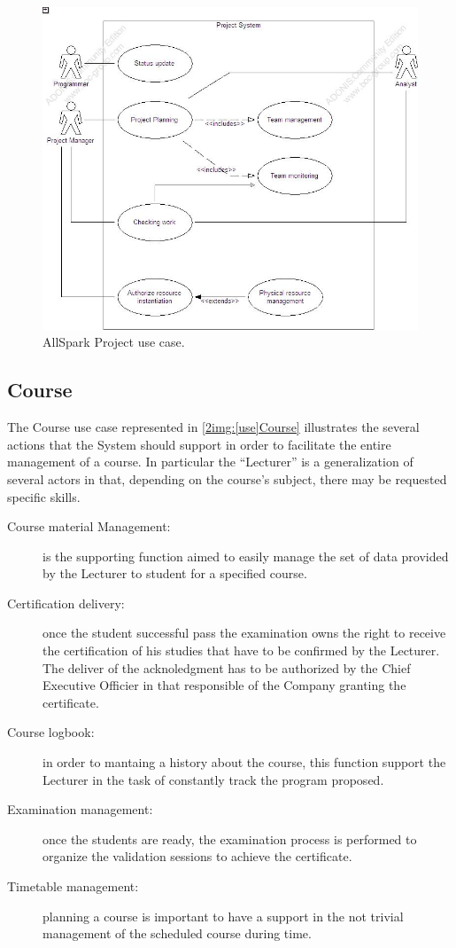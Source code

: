 \begin{figure}
\begin{centering}
\includegraphics[scale=0.45]{assign3/adonis/imgs/project.jpg}
\caption{AllSpark Project use case.}
\label{2img:[use]project}
\end{centering}
\end{figure}

\subsection{Course}
The Course use case represented in \ref{2img:[use]Course} illustrates the several actions that the System should support in order to facilitate the entire management of a course. In particular the ``Lecturer'' is a generalization of several actors in that, depending on the course's subject, there may be requested specific skills.
\begin{description}
 \item[Course material Management:] is the supporting function aimed to easily manage the set of data provided by the Lecturer to student for a specified course.
 \item[Certification delivery:] once the student successful pass the examination owns the right to receive the certification of his studies that have to be confirmed by the Lecturer. The deliver of the acknoledgment has to be authorized by the Chief Executive Officier in that responsible of the Company granting the certificate.
 \item[Course logbook:] in order to mantaing a history about the course, this function support the Lecturer in the task of constantly track the program proposed.
 \item[Examination management:] once the students are ready, the examination process is performed to organize the validation sessions to achieve the certificate.
 \item[Timetable management:] planning a course is important to have a support in the not trivial management of the scheduled course during time.
\end{description}

